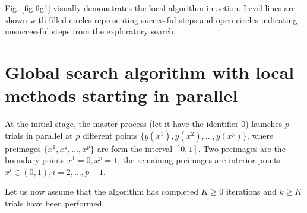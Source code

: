 \documentclass[runningheads]{llncs}
\begin{document}
Fig. \ref{fig:fig1} visually demonstrates the local algorithm in action. Level lines are shown with filled circles representing successful steps and open circles indicating unsuccessful steps from the exploratory search. 


\section{Global search algorithm with local methods starting in parallel}\label{SecGSA}


At the initial stage, the master process (let it have the identifier 0) launches $p$ trials in parallel at $p$ different points $\{y\left(x^1\right),y\left(x^2\right),\ldots,y\left(x^p\right)\}$, where preimages $\{x^1,x^2,\ldots,x^p\}$ are form the interval $[0,1]$.
Two preimages are the boundary points $x^1=0, x^p=1$; the remaining preimages are interior points $x^i\in\left(0,1\right),i=2,\ldots,p-1$.

Let us now assume that the algorithm has completed $K \geq 0$ iterations and $k \geq K$ trials have been performed.

\end{document}
